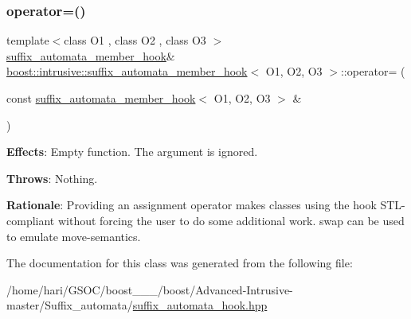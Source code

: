 \subsubsection{\texorpdfstring{operator=()}{operator=()}}
{\footnotesize\ttfamily template$<$class O1 , class O2 , class O3 $>$ \\
\hyperlink{classboost_1_1intrusive_1_1suffix__automata__member__hook}{suffix\+\_\+automata\+\_\+member\+\_\+hook}\& \hyperlink{classboost_1_1intrusive_1_1suffix__automata__member__hook}{boost\+::intrusive\+::suffix\+\_\+automata\+\_\+member\+\_\+hook}$<$ O1, O2, O3 $>$\+::operator= (\begin{DoxyParamCaption}\item[{const \hyperlink{classboost_1_1intrusive_1_1suffix__automata__member__hook}{suffix\+\_\+automata\+\_\+member\+\_\+hook}$<$ O1, O2, O3 $>$ \&}]{ }\end{DoxyParamCaption})}

{\bfseries Effects}\+: Empty function. The argument is ignored.

{\bfseries Throws}\+: Nothing.

{\bfseries Rationale}\+: Providing an assignment operator makes classes using the hook S\+T\+L-\/compliant without forcing the user to do some additional work. {\ttfamily swap} can be used to emulate move-\/semantics. 

The documentation for this class was generated from the following file\+:\begin{DoxyCompactItemize}
\item 
/home/hari/\+G\+S\+O\+C/boost\+\_\+\_\+\_/boost/\+Advanced-\/\+Intrusive-\/master/\+Suffix\+\_\+automata/\hyperlink{suffix__automata__hook_8hpp}{suffix\+\_\+automata\+\_\+hook.\+hpp}\end{DoxyCompactItemize}
